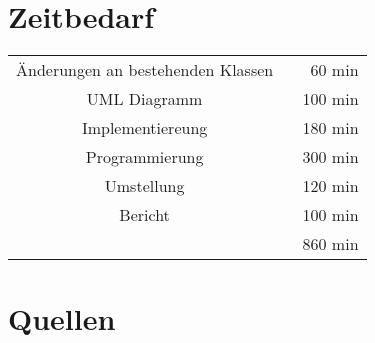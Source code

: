 \documentclass[14pt]{extarticle}
\begin{document}
\section{Zeitbedarf}
\begin{center}
\begin{tabular}{cr}
Änderungen an bestehenden Klassen \	&60 min	\\
UML Diagramm	  \	&100 min	\\
Implementiereung 	\	&180 min	\\
Programmierung \	&300 min	\\
Umstellung \	&120 min	\\
Bericht  \		&100 min	 \\
	\hline
	&860 min
\end{tabular}
\end{center}

\section{Quellen}
\end{document}
